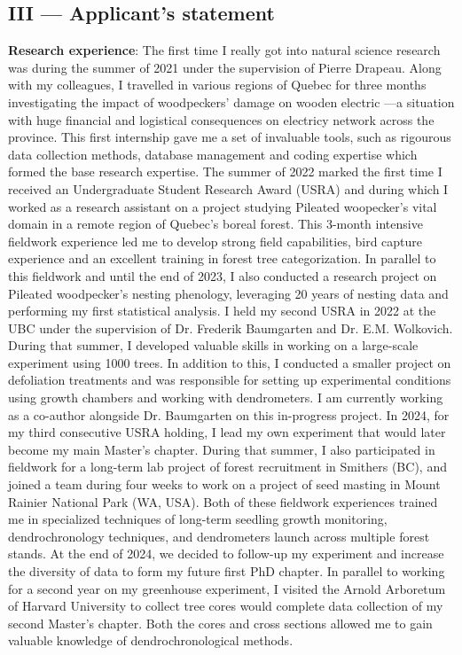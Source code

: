 \documentclass[12pt]{article}
\begin{document}
\subsection*{III --- Applicant’s statement}

\textbf{Research experience}: The first time I really got into natural science research was during the summer of 2021 under the supervision of Pierre Drapeau. Along with my colleagues, I travelled in various regions of Quebec for three months investigating the impact of woodpeckers' damage on wooden electric ---a situation with huge financial and logistical consequences on electricy network across the province. This first internship gave me a set of invaluable tools, such as rigourous data collection methods, database management and coding expertise which formed the base research expertise. The summer of 2022 marked the first time I received an Undergraduate Student Research Award (USRA) and during which I worked as a research assistant on a project studying Pileated woopecker's vital domain in a remote region of Quebec's boreal forest. This 3-month intensive fieldwork experience led me to develop strong field capabilities, bird capture experience and an excellent training in forest tree categorization. In parallel to this fieldwork and until the end of 2023, I also conducted a research project on Pileated woodpecker's nesting phenology, leveraging 20 years of nesting data and performing my first statistical analysis. I held my second USRA in 2022 at the UBC under the supervision of Dr. Frederik Baumgarten and Dr. E.M. Wolkovich. During that summer, I developed valuable skills in working on a large-scale experiment using 1000 trees. In addition to this, I conducted a smaller project on defoliation treatments and was responsible for setting up experimental conditions using growth chambers and working with dendrometers. I am currently working as a co-author alongside Dr. Baumgarten on this in-progress project. In 2024, for my third consecutive USRA holding, I lead my own experiment that would later become my main Master's chapter. During that summer, I also participated in fieldwork for a long-term lab project of forest recruitment in Smithers (BC), and joined a team during four weeks to work on a project of seed masting in Mount Rainier National Park (WA, USA). Both of these fieldwork experiences trained me in specialized techniques of long-term seedling growth monitoring, dendrochronology techniques, and dendrometers launch across multiple forest stands.  At the end of 2024, we decided to follow-up my experiment and increase the diversity of data to form my future first PhD chapter. In parallel to working for a second year on my greenhouse experiment, I visited the Arnold Arboretum of Harvard University to collect tree cores would complete data collection of my second Master's chapter. Both the cores and cross sections allowed me to gain valuable knowledge of dendrochronological methods.
\end{document}
